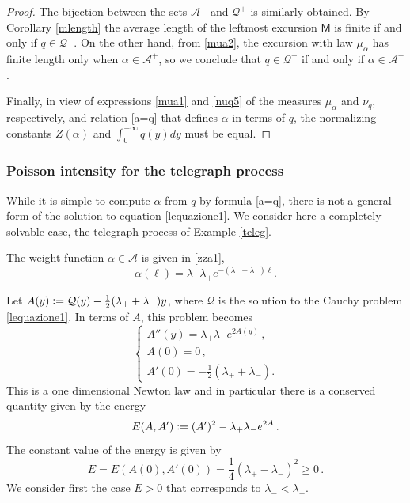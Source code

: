 \documentclass[12pt]{article}
\numberwithin{equation}{section}
\newcommand{\sM}{\mathsf{M}}
\begin{document}
\begin{proof}
The bijection between the sets $\mathcal A^+$ and $\mathscr Q^+$ is similarly obtained. By Corollary \ref{mlength} the average length of the leftmost excursion $\sM$ is finite if and only if 
$q\in \mathscr Q^+$. On the other hand, from \eqref{mua2}, the excursion with law $\mu_\alpha$ has finite length only when $\alpha \in \mathcal A^+$, so we conclude that $q\in \mathscr Q^+$ if and only if $\alpha \in \mathcal A^+$.

Finally, in view of expressions \eqref{mua1} and \eqref{nuq5} of the measures $\mu_\alpha$ and $\nu_q$, respectively, and relation \eqref{a=q} that defines $\alpha$ in terms of $q$, the normalizing constants $Z(\alpha)$ and $\int_0^{+\infty} q(y)dy$ must be equal. \end{proof}

\subsubsection{Poisson intensity for the telegraph process}
\label{PoiTel}

While it is simple to compute $\alpha$ from $q$ by formula \eqref{a=q}, there is not a general form of the solution to equation \eqref{lequazione1}.
We consider here a completely solvable case, the telegraph process of Example \ref{teleg}. 

The weight function $\alpha \in \mathcal A$ is given in \eqref{zza1}, 
\begin{equation}\label{malfa}
	\alpha(\ell )=\lambda_-\lambda_+e^{-(\lambda_-+\lambda_+)\ell }.
\end{equation}

Let $A(y)\vcentcolon =\mathcal Q(y)-\frac12(\lambda_++\lambda_-)y$, where $\mathcal Q$ is the solution to the Cauchy problem \eqref{lequazione1}. In terms of $A$, this problem becomes 
\begin{equation}\label{lequazione2}
	\left\{
	\begin{array}{l}
		A''(y)=\lambda_+\lambda_- e^{2A(y)}\, , \\
		A(0)=0\, , \\
		A'(0)=-\frac12(\lambda_++\lambda_-).
	\end{array}
	\right.
\end{equation}
This is a one dimensional Newton law and in particular there is a conserved quantity given by the energy 
\begin{equation}\label{energy}
	E(A, A')\vcentcolon =(A')^2-\lambda_+\lambda_-e^{2A}\, .
\end{equation}
The constant value of the energy is given by 
\begin{equation}\label{valoreen}
	E=E(A(0), A'(0))=\frac14(\lambda_+-\lambda_-)^2\ge0\, .
\end{equation}
We consider first the case $E>0$ that corresponds to $\lambda_-<\lambda_+$. 
\end{document}
